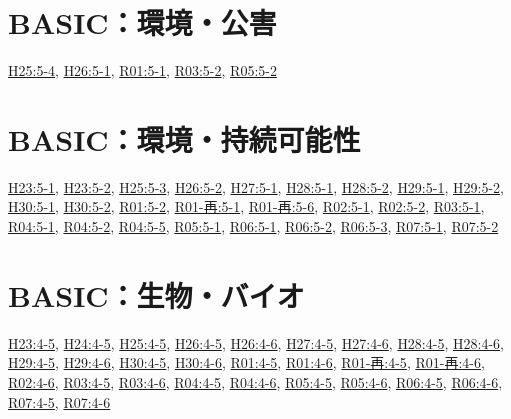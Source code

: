 \section{BASIC：環境・公害}
\hyperref[q:h25-reg-basic-5-4]{H25:5-4}, \hyperref[q:h26-reg-basic-5-1]{H26:5-1}, \hyperref[q:r01-reg-basic-5-1]{R01:5-1}, \hyperref[q:r03-reg-basic-5-2]{R03:5-2}, \hyperref[q:r05-reg-basic-5-2]{R05:5-2}
\section{BASIC：環境・持続可能性}
\hyperref[q:h23-reg-basic-5-1]{H23:5-1}, \hyperref[q:h23-reg-basic-5-2]{H23:5-2}, \hyperref[q:h25-reg-basic-5-3]{H25:5-3}, \hyperref[q:h26-reg-basic-5-2]{H26:5-2}, \hyperref[q:h27-reg-basic-5-1]{H27:5-1}, \hyperref[q:h28-reg-basic-5-1]{H28:5-1}, \hyperref[q:h28-reg-basic-5-2]{H28:5-2}, \hyperref[q:h29-reg-basic-5-1]{H29:5-1}, \hyperref[q:h29-reg-basic-5-2]{H29:5-2}, \hyperref[q:h30-reg-basic-5-1]{H30:5-1}, \hyperref[q:h30-reg-basic-5-2]{H30:5-2}, \hyperref[q:r01-reg-basic-5-2]{R01:5-2}, \hyperref[q:r01-ret-basic-5-1]{R01-再:5-1}, \hyperref[q:r01-ret-basic-5-6]{R01-再:5-6}, \hyperref[q:r02-reg-basic-5-1]{R02:5-1}, \hyperref[q:r02-reg-basic-5-2]{R02:5-2}, \hyperref[q:r03-reg-basic-5-1]{R03:5-1}, \hyperref[q:r04-reg-basic-5-1]{R04:5-1}, \hyperref[q:r04-reg-basic-5-2]{R04:5-2}, \hyperref[q:r04-reg-basic-5-5]{R04:5-5}, \hyperref[q:r05-reg-basic-5-1]{R05:5-1}, \hyperref[q:r06-reg-basic-5-1]{R06:5-1}, \hyperref[q:r06-reg-basic-5-2]{R06:5-2}, \hyperref[q:r06-reg-basic-5-3]{R06:5-3}, \hyperref[q:r07-reg-basic-5-1]{R07:5-1}, \hyperref[q:r07-reg-basic-5-2]{R07:5-2}
\section{BASIC：生物・バイオ}
\hyperref[q:h23-reg-basic-4-5]{H23:4-5}, \hyperref[q:h24-reg-basic-4-5]{H24:4-5}, \hyperref[q:h25-reg-basic-4-5]{H25:4-5}, \hyperref[q:h26-reg-basic-4-5]{H26:4-5}, \hyperref[q:h26-reg-basic-4-6]{H26:4-6}, \hyperref[q:h27-reg-basic-4-5]{H27:4-5}, \hyperref[q:h27-reg-basic-4-6]{H27:4-6}, \hyperref[q:h28-reg-basic-4-5]{H28:4-5}, \hyperref[q:h28-reg-basic-4-6]{H28:4-6}, \hyperref[q:h29-reg-basic-4-5]{H29:4-5}, \hyperref[q:h29-reg-basic-4-6]{H29:4-6}, \hyperref[q:h30-reg-basic-4-5]{H30:4-5}, \hyperref[q:h30-reg-basic-4-6]{H30:4-6}, \hyperref[q:r01-reg-basic-4-5]{R01:4-5}, \hyperref[q:r01-reg-basic-4-6]{R01:4-6}, \hyperref[q:r01-ret-basic-4-5]{R01-再:4-5}, \hyperref[q:r01-ret-basic-4-6]{R01-再:4-6}, \hyperref[q:r02-reg-basic-4-6]{R02:4-6}, \hyperref[q:r03-reg-basic-4-5]{R03:4-5}, \hyperref[q:r03-reg-basic-4-6]{R03:4-6}, \hyperref[q:r04-reg-basic-4-5]{R04:4-5}, \hyperref[q:r04-reg-basic-4-6]{R04:4-6}, \hyperref[q:r05-reg-basic-4-5]{R05:4-5}, \hyperref[q:r05-reg-basic-4-6]{R05:4-6}, \hyperref[q:r06-reg-basic-4-5]{R06:4-5}, \hyperref[q:r06-reg-basic-4-6]{R06:4-6}, \hyperref[q:r07-reg-basic-4-5]{R07:4-5}, \hyperref[q:r07-reg-basic-4-6]{R07:4-6}
